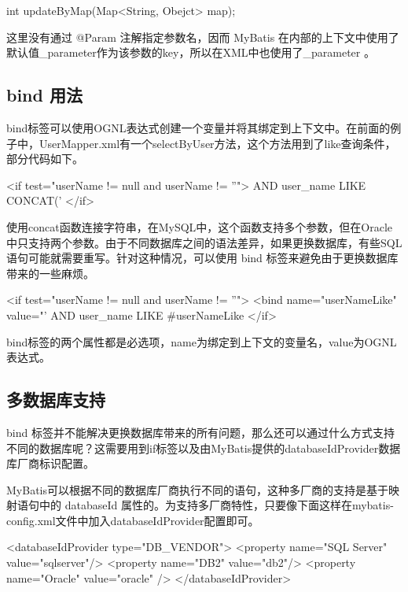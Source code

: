 \begin{Java}
int updateByMap(Map<String, Obejct> map);
\end{Java}

这里没有通过 @Param 注解指定参数名，因而 MyBatis 在内部的上下文中使用了默认值\_parameter作为该参数的key，所以在XML中也使用了\_parameter 。

\subsection{bind 用法}

bind标签可以使用OGNL表达式创建一个变量并将其绑定到上下文中。在前面的例子中，UserMapper.xml有一个selectByUser方法，这个方法用到了like查询条件，部分代码如下。

\begin{xml}
<if test="userName != null and userName != ''">
    AND user_name LIKE CONCAT('%
</if>
\end{xml}

使用concat函数连接字符串，在MySQL中，这个函数支持多个参数，但在Oracle中只支持两个参数。由于不同数据库之间的语法差异，如果更换数据库，有些SQL语句可能就需要重写。针对这种情况，可以使用 bind 标签来避免由于更换数据库带来的一些麻烦。

\begin{xml}
<if test="userName != null and userName != ''">
    <bind name="userNameLike" value="'%
    AND user_name LIKE #{userNameLike}
</if>
\end{xml}

bind标签的两个属性都是必选项，name为绑定到上下文的变量名，value为OGNL表达式。

\subsection{多数据库支持}

bind 标签并不能解决更换数据库带来的所有问题，那么还可以通过什么方式支持不同的数据库呢？这需要用到if标签以及由MyBatis提供的databaseIdProvider数据库厂商标识配置。

MyBatis可以根据不同的数据库厂商执行不同的语句，这种多厂商的支持是基于映射语句中的 databaseId 属性的。为支持多厂商特性，只要像下面这样在mybatis-config.xml文件中加入databaseIdProvider配置即可。

\begin{xml}
<databaseIdProvider type="DB_VENDOR">
    <property name="SQL Server" value="sqlserver"/>
    <property name="DB2" value="db2"/>
    <property name="Oracle" value="oracle" />
</databaseIdProvider>
\end{xml}

